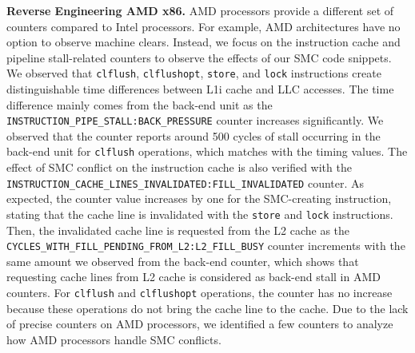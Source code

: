 \noindent \textbf{Reverse Engineering AMD x86.} AMD processors provide a different set of counters compared to Intel processors. For example, AMD architectures have no option to observe machine clears. Instead, we focus on the instruction cache and pipeline stall-related counters to observe the effects of our SMC code snippets. We observed that \texttt{clflush}, \texttt{clflushopt}, \texttt{store}, and \texttt{lock} instructions create distinguishable time differences between L1i cache and LLC accesses. The time difference mainly comes from the back-end unit as the \texttt{INSTRUCTION\_PIPE\_STALL:BACK\_PRESSURE} counter increases significantly. We observed that the counter reports around 500 cycles of stall occurring in the back-end unit for \texttt{clflush} operations, which matches with the timing values. The effect of SMC conflict on the instruction cache is also verified with the \texttt{INSTRUCTION\_\allowbreak CACHE\_\allowbreak LINES\_\allowbreak INVALIDATED:FILL\_\allowbreak INVALIDATED} counter. As expected, the counter value increases by one for the SMC-creating instruction, stating that the cache line is invalidated with the \texttt{store} and \texttt{lock} instructions. Then, the invalidated cache line is requested from the L2 cache as the \texttt{CYCLES\_\allowbreak WITH\_\allowbreak FILL\_\allowbreak PENDING\_\allowbreak FROM\_\allowbreak L2:L2\_\allowbreak FILL\_\allowbreak BUSY} counter increments with the same amount we observed from the back-end counter, which shows that requesting cache lines from L2 cache is considered as back-end stall in AMD counters. For \texttt{clflush} and \texttt{clflushopt} operations, the counter has no increase because these operations do not bring the cache line to the cache. Due to the lack of precise counters on AMD processors, we identified a few counters to analyze how AMD processors handle SMC conflicts.


